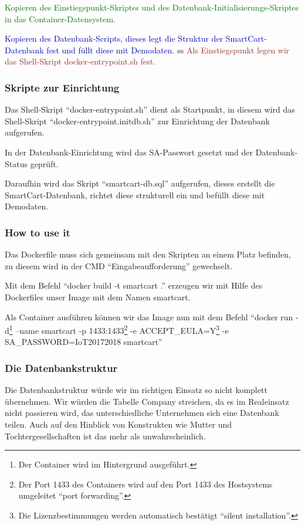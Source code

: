 \documentclass{sigchi}
\begin{document}
\textcolor{green}{Kopieren des Einstiegspunkt-Skriptes und des Datenbank-Initialisierungs-Skriptes in das Container-Datensystem.}

\textcolor{blue}{Kopieren des Datenbank-Scripts, dieses legt die Struktur der SmartCart-Datenbank fest und füllt diese mit Demodaten.}
ss
\textcolor{brown}{Als Einstiegspunkt legen wir das Shell-Skript docker-entrypoint.sh fest.}

\subsubsection{Skripte zur Einrichtung}
Das Shell-Skript “docker-entrypoint.sh” dient als Startpunkt, in diesem wird das Shell-Skript “docker-entrypoint.initdb.sh” zur Einrichtung der Datenbank aufgerufen.

In der Datenbank-Einrichtung wird das SA-Passwort gesetzt und der Datenbank-Status geprüft.

Daraufhin wird das Skript “smartcart-db.sql” aufgerufen, dieses erstellt die SmartCart-Datenbank, richtet diese strukturell ein und befüllt diese mit Demodaten.


\subsubsection{How to use it}
Das Dockerfile muss sich gemeinsam mit den Skripten an einem Platz befinden, zu diesem wird in der CMD “Eingabeaufforderung” gewechselt.

Mit dem Befehl “docker build -t smartcart .” erzeugen wir mit Hilfe des Dockerfiles unser Image mit dem Namen smartcart.

Als Container ausführen können wir das Image nun mit dem Befehl 
“docker run -d\footnote{Der Container wird im Hintergrund ausgeführt.} --name smartcart -p 1433:1433\footnote{Der Port 1433 des Containers wird auf den Port 1433 des Hostsystems umgeleitet “port forwarding”.} -e ACCEPT\_EULA=Y\footnote{Die Lizenzbestimmungen werden automatisch bestätigt “silent installation”.} -e SA\_PASSWORD=IoT20172018 smartcart”

\subsubsection{Die Datenbankstruktur}
Die Datenbankstruktur würde wir im richtigen Einsatz so nicht komplett übernehmen.
Wir würden die Tabelle Company streichen, da es im Realeinsatz nicht passieren wird, das unterschiedliche Unternehmen sich eine Datenbank teilen. Auch auf den Hinblick von Konstrukten wie Mutter und Tochtergesellschaften ist das mehr als unwahrscheinlich.
\end{document}
